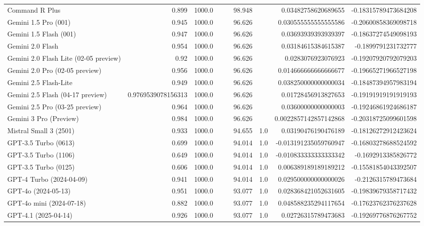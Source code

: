\begin{table}[htp]
{\begin{tabular}{lrrrrrrrr}
Command R Plus & 0.899 & 1000.0 &  &  & 98.948 &  & 0.03482758620689655 & -0.18315789473684208 \\
Gemini 1.5 Pro (001) & 0.945 & 1000.0 &  &  & 96.626 &  & 0.030555555555555586 & -0.20600858369098718 \\
Gemini 1.5 Flash (001) & 0.947 & 1000.0 &  &  & 96.626 &  & 0.03693939393939397 & -0.18637274549098193 \\
Gemini 2.0 Flash & 0.954 & 1000.0 &  &  & 96.626 &  & 0.03184615384615387 & -0.1899791231732777 \\
Gemini 2.0 Flash Lite (02-05 preview) & 0.92 & 1000.0 &  &  & 96.626 &  & 0.0283076923076923 & -0.19207920792079203 \\
Gemini 2.0 Pro (02-05 preview) & 0.956 & 1000.0 &  &  & 96.626 &  & 0.014666666666666677 & -0.19665271966527198 \\
Gemini 2.5 Flash-Lite & 0.949 & 1000.0 &  &  & 96.626 &  & 0.038250000000000034 & -0.18487394957983194 \\
Gemini 2.5 Flash (04-17 preview) & 0.9769539078156313 & 1000.0 &  &  & 96.626 &  & 0.01728456913827653 & -0.19191919191919193 \\
Gemini 2.5 Pro (03-25 preview) & 0.964 & 1000.0 &  &  & 96.626 &  & 0.03600000000000003 & -0.19246861924686187 \\
Gemini 3 Pro (Preview) & 0.984 & 1000.0 &  &  & 96.626 &  & 0.0022857142857142868 & -0.20318725099601598 \\
Mistral Small 3 (2501) & 0.933 & 1000.0 &  &  & 94.655 & 1.0 & 0.03190476190476189 & -0.18126272912423624 \\
GPT-3.5 Turbo (0613) & 0.699 & 1000.0 &  &  & 94.014 & 1.0 & -0.013191235059760947 & -0.16803278688524592 \\
GPT-3.5 Turbo (1106) & 0.649 & 1000.0 &  &  & 94.014 & 1.0 & -0.010833333333333342 & -0.1692913385826772 \\
GPT-3.5 Turbo (0125) & 0.606 & 1000.0 &  &  & 94.014 & 1.0 & 0.006389189189189212 & -0.15581854043392507 \\
GPT-4 Turbo (2024-04-09) & 0.941 & 1000.0 &  &  & 94.014 & 1.0 & 0.029500000000000026 & -0.2126315789473684 \\
GPT-4o (2024-05-13) & 0.951 & 1000.0 &  &  & 93.077 & 1.0 & 0.028368421052631605 & -0.19839679358717432 \\
GPT-4o mini (2024-07-18) & 0.882 & 1000.0 &  &  & 93.077 & 1.0 & 0.048588235294117654 & -0.17623762376237628 \\
GPT-4.1 (2025-04-14) & 0.926 & 1000.0 &  &  & 93.077 & 1.0 & 0.02726315789473683 & -0.19269776876267752 \\

\end{tabular}}
\end{table}
